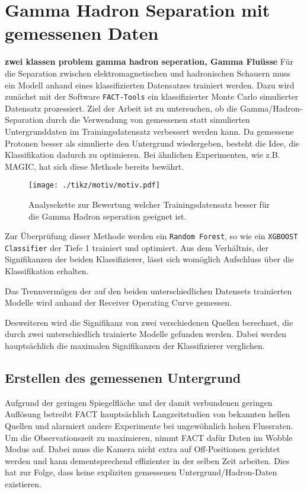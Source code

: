 \chapter{Gamma Hadron Separation mit gemessenen Daten}
\textbf{zwei klassen problem gamma hadron seperation, Gamma Fluüsse}
Für die Separation zwischen elektromagnetischen und hadronischen Schauern muss ein Modell anhand eines klassifizierten Datensatzes trainiert werden.
Dazu wird zunächst mit der Software \texttt{FACT-Tools} ein klassifizierter Monte Carlo simulierter Datensatz prozessiert.
Ziel der Arbeit ist zu untersuchen, ob die Gamma/Hadron-Separation durch die Verwendung von gemessenen statt simulierten Untergrunddaten im Trainingsdatensatz verbessert werden kann.
Da gemessene Protonen besser als simulierte den Untergrund wiedergeben, besteht die Idee, die Klassifikation dadurch zu optimieren.
Bei ähnlichen Experimenten, wie z.B. MAGIC, hat sich diese Methode bereits bewährt. 
\begin{figure}[H]
  \centering
  \texttt{[image: ./tikz/motiv/motiv.pdf]}
  \caption{Analysekette zur Bewertung welcher Trainingsdatensatz besser für die Gamma Hadron seperation geeignet ist.}
\end{figure}
Zur Überprüfung dieser Methode werden ein \texttt{Random Forest}, so wie ein \texttt{XGBOOST Classifier} der Tiefe 1 trainiert und optimiert.
Aus dem Verhältnis, der Signifikanzen der beiden Klassifizierer, lässt sich womöglich Aufschluss über die Klassifikation erhalten.

Das Trennvermögen der auf den beiden unterschiedlichen Datensets trainierten Modelle wird anhand der Receiver Operating Curve gemessen.

Desweiteren wird die Signifikanz von zwei verschiedenen Quellen berechnet, die durch zwei unterschiedlich trainierte Modelle gefunden werden. 
Dabei werden hauptsächlich die maximalen Signifikanzen der Klassifizierer verglichen.
\section{Erstellen des gemessenen Untergrund}
\label{sec:makeUnter}
Aufgrund der geringen Spiegelfläche und der damit verbundenen geringen Auflösung betreibt FACT hauptsächlich Langzeitstudien von bekannten hellen Quellen und alarmiert andere Experimente bei ungewöhnlich hohen Flussraten.
Um die Observationszeit zu maximieren, nimmt FACT dafür Daten im Wobble Modus auf. 
Dabei muss die Kamera nicht extra auf Off-Positionen gerichtet werden und kann dementsprechend effizienter in der selben Zeit arbeiten. 
Dies hat zur Folge, dass keine expliziten gemessenen Untergrund/Hadron-Daten existieren. 

